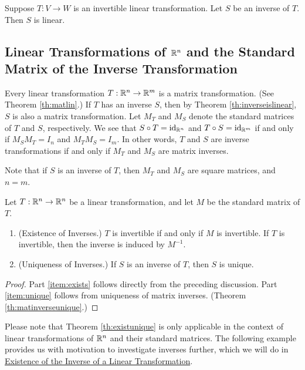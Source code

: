 \documentclass{ximera}
\begin{document}
\begin{theorem}\label{th:inverseislinear} Suppose $T:V\rightarrow W$ is an invertible linear transformation.  Let $S$ be an inverse of $T$.  Then $S$ is  linear.
\end{theorem}
 
 
\subsection*{Linear Transformations of $\mathbb{R}^n$ and the Standard Matrix of the Inverse Transformation}
 
Every linear transformation $T:\mathbb{R}^n\rightarrow\mathbb{R}^m$ is a matrix transformation. (See Theorem \ref{th:matlin}.)  If $T$ has an inverse $S$, then by Theorem \ref{th:inverseislinear}, $S$ is also a matrix transformation.  Let  $M_T$ and $M_S$ denote the standard matrices of $T$ and $S$, respectively.  We see that $S\circ T=\text{id}_{\mathbb{R}^n}$ and $T\circ S=\text{id}_{\mathbb{R}^m}$ if and only if $M_SM_T=I_{n}$ and $M_TM_S=I_{m}$.  In other words, $T$ and $S$ are inverse transformations if and only if $M_T$ and $M_S$ are matrix inverses.
 
Note that if $S$ is an inverse of $T$, then $M_T$ and $M_S$ are square matrices, and $n=m$.

 
\begin{theorem}\label{th:existunique} Let $T:\mathbb{R}^n\rightarrow \mathbb{R}^n$ be a linear transformation, and let $M$ be the standard matrix of $T$.
  \begin{enumerate}
  \item \label{item:exists} (Existence of Inverses.)  $T$ is invertible if and only if $M$ is invertible.  If $T$ is invertible, then the inverse is induced by $M^{-1}$.
  \item \label{item:unique} (Uniqueness of Inverses.)  If $S$ is an inverse of $T$, then $S$ is unique.
  \end{enumerate}
\end{theorem}
\begin{proof}
Part \ref{item:exists} follows directly from the preceding discussion.  Part \ref{item:unique} follows from uniqueness of matrix inverses. (Theorem \ref{th:matinverseunique}.)
\end{proof}


 
Please note that Theorem \ref{th:existunique} is only applicable in the context of linear transformations of $\mathbb{R}^n$ and their standard matrices.  The following example provides us with motivation to investigate inverses further, which we will do in \href{https://ximera.osu.edu/oerlinalg/LinearAlgebra/LTR-0035/main}{Existence of the Inverse of a Linear Transformation}.
 
\end{document}
